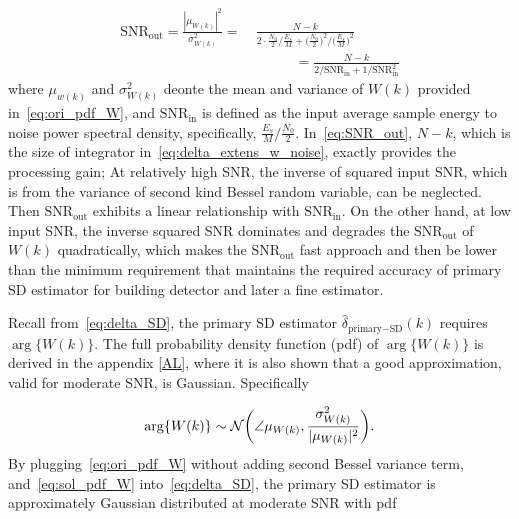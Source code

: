 \begin{equation}
  \begin{aligned}
    \label{eq:SNR_out}
    \text{SNR}_{\text{out}}=\frac{|\mu_{W(k)}|^2}{\sigma^2_{W(k)}} 
    =&~\frac{N-k}{\displaystyle 2\cdot\frac{N_0}{2}/\frac{E_s}{M}+\Big(\frac{N_0}{2}\Big)^2/\Big(\frac{E_s}{M}\Big)^2} \\
    &~~~~~~~~~\quad =\frac{N-k}{2/\text{SNR}_{\text{in}}+1/\text{SNR}_{\text{in}}^2}
  \end{aligned}
\end{equation}
where $\mu_{w(k)}$ and $\sigma^2_{W(k)}$ deonte the mean and variance of $W(k)$ provided in~\eqref{eq:ori_pdf_W}, and $\text{SNR}_{\text{in}}$ is defined as the input average sample energy to noise power spectral density, specifically, $\frac{E_s}{M}/\frac{N_0}{2}$. In~\eqref{eq:SNR_out}, 
$N-k$, which is the size of integrator in~\eqref{eq:delta_extens_w_noise}, exactly provides the processing gain; At relatively high SNR,
the inverse of squared input SNR, which is from the variance of second kind Bessel random variable, can be neglected. Then $\text{SNR}_{\text{out}}$
exhibits a linear relationship with $\text{SNR}_{\text{in}}$. On the other hand, at low input SNR, the inverse squared SNR dominates and degrades the $\text{SNR}_{\text{out}}$
of $W(k)$ quadratically, which makes the $\text{SNR}_{\text{out}}$ fast approach and then be lower than the minimum requirement that maintains the required accuracy of 
primary SD estimator for building detector and later a fine estimator.

Recall from~\eqref{eq:delta_SD}, the primary SD estimator $\hat{\delta}_{\text{primary}-\text{SD}}(k)$ requires $\arg\{W(k)\}$.
The full probability density function (pdf) of $\arg\{W(k)\}$ is derived in the appendix \ref{AL},
where it is also shown that a good approximation, valid for moderate SNR, 
is Gaussian. Specifically 

\begin{equation}
    \label{eq:sol_pdf_W}
    \arg\{W(k)\} \sim \mathcal{N}\bigg(\angle \mu_{W(k)},\frac{\sigma^2_{W(k)}}{|\mu_{W(k)}|^2}\bigg).
  \end{equation}
By plugging~\eqref{eq:ori_pdf_W} without adding second Bessel variance term, and~\eqref{eq:sol_pdf_W} into~\eqref{eq:delta_SD}, the primary SD estimator
is approximately Gaussian distributed at moderate SNR with pdf

